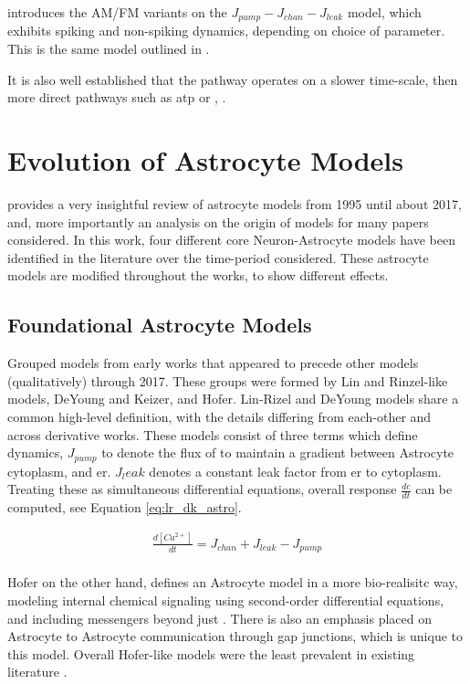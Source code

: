     \parencite{pitta_2009} introduces the AM/FM variants on the $J_{pump} -
    J_{chan} - J_{leak}$ model, which exhibits spiking and non-spiking \ca
    dynamics, depending on choice of parameter. This is the same model outlined
    in \cite{wade_2011}.

    It is also well established that the \ipt pathway operates on a slower
    time-scale, then more direct pathways such as \Gls{atp} or \kp
    \cite{postnov_2009}, \cite{bassam_2015}.

    \section{Evolution of Astrocyte Models}
    \parencite{manninen_2018} provides a very insightful review of astrocyte models
    from 1995 until about 2017, and, more importantly an analysis on the origin
    of models for many papers considered. In this work, four different core
    Neuron-Astrocyte models have been identified in the literature over the
    time-period considered. These astrocyte models are modified throughout the
    works, to show different effects.

    \subsection{Foundational Astrocyte Models}
    \parencite{manninen_2018} Grouped models from early works that appeared to
    precede other models (qualitatively) through 2017. These groups were formed by
    Lin and Rinzel-like models, DeYoung and Keizer, and Hofer. Lin-Rizel and
    DeYoung models share a common high-level definition, with the details
    differing from each-other and across derivative works. These models consist
    of three terms which define \ca dynamics, $J_{pump}$ to denote the flux of
    \ca to maintain a gradient between Astrocyte cytoplasm, and
    \Gls{er}. $J_leak$ denotes a constant leak factor from \Gls{er} to
    cytoplasm. Treating these as simultaneous differential equations, overall
    \ca response $\frac{dc}{dt}$ can be computed, see Equation
    \ref{eq:lr_dk_astro}.

    \begin{align}
      \frac{d[Ca^{2+}]}{dt} = J_{chan} + J_{leak} -
      J_{pump} \label{eq:lr_dk_astro} \\
    \end{align}

    Hofer on the other hand, defines an Astrocyte model in a more bio-realisitc
    way, modeling internal chemical signaling using second-order differential
    equations, and including messengers beyond just \ipt. There is also an
    emphasis placed on Astrocyte to Astrocyte communication through gap
    junctions, which is unique to this model. Overall Hofer-like models were the
    least prevalent in existing literature \cite{manninen_2018}.

